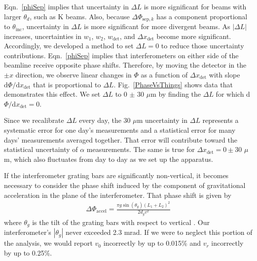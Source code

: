 \documentclass[twocolumn,pra,showpacs,superscriptaddress,longbibliography]{revtex4-1}   %
\newcommand{\figref}[1]{Fig.~\ref{#1}}
\newcommand{\eqnref}[1]{Eqn.~\eqref{#1}}
\newcommand{\dphisepk}{\Delta\Phi_{\mathrm{sep},k}}
\newcommand{\dphiaccel}{\Delta\Phi_{\mathrm{accel}}}
\begin{document}
\eqnref{phiSep} implies that uncertainty in $\Delta L$ is more significant for beams with larger $\theta_d$, such as K beams.
Also, because $\dphisepk$ has a component proportional to $\theta_{\mathrm{inc}}$, uncertainty in $\Delta L$ is more significant for more divergent beams.
As $|\Delta L|$ increases, uncertainties in $w_1$, $w_2$, $w_{\mathrm{det}}$, and $\Delta x_{\mathrm{det}}$ become more significant. Accordingly, we developed a method to set $\Delta L = 0$ to reduce those uncertainty contributions. 
\eqnref{phiSep} implies that interferometers on either side of the beamline receive opposite phase shifts. 
Therefore, by moving the detector in the $\pm x$ direction, we  observe linear changes in $\Phi$ as a function of $\Delta x_{\mathrm{det}}$ with slope $\mathrm{d}\Phi/\mathrm{d}x_{\mathrm{det}}$ that is proportional to $\Delta L$.
\figref{PhaseVsThings} shows data that demonstrates this effect.
We set $\Delta L$ to 0 $\pm$ 30 $\mu$m by finding the $\Delta L$ for which d$\Phi/$d$x_{\mathrm{det}} = 0$.

Since we recalibrate $\Delta L$ every day, the 30 $\mu$m uncertainty in $\Delta L$ represents a systematic error for one day's measurements and a statistical error for many days' measurements averaged together. That error will contribute toward the statistical uncertainty of $\alpha$ measurements.
The same is true for $\Delta x_{\mathrm{det}} = 0 \pm 30$ $\mu$m, which also fluctuates from day to day as we set up the apparatus.

If the interferometer grating bars are significantly non-vertical, it becomes necessary to consider the phase shift induced by the component of gravitational acceleration in the plane of the interferometer. That phase shift is given by
\begin{align}
	\dphiaccel = \frac{\pi g\sin({\theta_g})(L_1+L_2)^2}{2d_g v^2}
	\label{phiAccel}
\end{align}
where $\theta_g$ is the tilt of the grating bars with respect to vertical \cite{Greenberg2014,Trubko2015a}. 
Our interferometer's $|\theta_g|$ never exceeded 2.3 mrad. If we were to neglect this portion of the analysis, we would report $v_0$ incorrectly by up to 0.015\% and $v_r$ incorrectly by up to 0.25\%.
\end{document}
